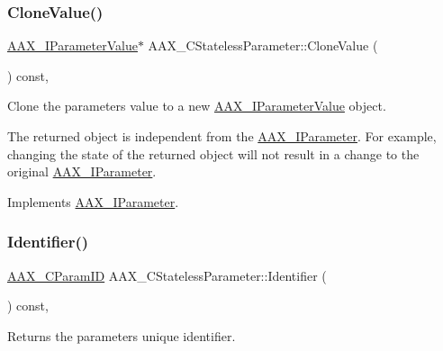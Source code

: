 \mbox{\label{a01541_a32390258de83c4007fdde4d51a597989}} 
\subsubsection{\texorpdfstring{CloneValue()}{CloneValue()}}
{\footnotesize\ttfamily \mbox{\hyperlink{a01853}{A\+A\+X\+\_\+\+I\+Parameter\+Value}}$\ast$ A\+A\+X\+\_\+\+C\+Stateless\+Parameter\+::\+Clone\+Value (\begin{DoxyParamCaption}{ }\end{DoxyParamCaption}) const\hspace{0.3cm}{\ttfamily [inline]}, {\ttfamily [virtual]}}



Clone the parameter\textquotesingle{}s value to a new \mbox{\hyperlink{a01853}{A\+A\+X\+\_\+\+I\+Parameter\+Value}} object. 

The returned object is independent from the \mbox{\hyperlink{a01857}{A\+A\+X\+\_\+\+I\+Parameter}}. For example, changing the state of the returned object will not result in a change to the original \mbox{\hyperlink{a01857}{A\+A\+X\+\_\+\+I\+Parameter}}. 

Implements \mbox{\hyperlink{a01857_a85ce34797e0a9bb3cf05458757144cb9}{A\+A\+X\+\_\+\+I\+Parameter}}.

\mbox{\label{a01541_a9ab991e0bad2bc76b7efba3d129f1953}} 
\subsubsection{\texorpdfstring{Identifier()}{Identifier()}}
{\footnotesize\ttfamily \mbox{\hyperlink{a00392_a1440c756fe5cb158b78193b2fc1780d1}{A\+A\+X\+\_\+\+C\+Param\+ID}} A\+A\+X\+\_\+\+C\+Stateless\+Parameter\+::\+Identifier (\begin{DoxyParamCaption}{ }\end{DoxyParamCaption}) const\hspace{0.3cm}{\ttfamily [inline]}, {\ttfamily [virtual]}}



Returns the parameter\textquotesingle{}s unique identifier. 

